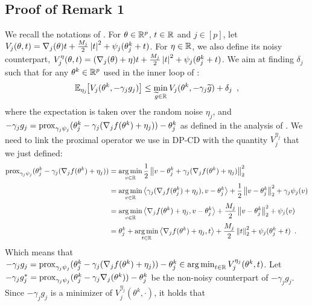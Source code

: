 
\subsection{Proof of Remark 1}
\label{sec:proof-remark-1}

We recall the notations of \citet{tappenden2016Inexact}.
For $\theta \in \mathbb R^p$, $t \in \mathbb R$ and $j \in [p]$, let
$V_j(\theta, t) = \nabla_j(\theta) t + \frac{M_j}{2} \left| t \right|^2 + \psi_j(\theta^k_j + t)$.
For $\eta \in \mathbb R$, we also define its noisy counterpart,
$V_j^{\eta}(\theta, t) = (\nabla_j(\theta) + \eta) t + \frac{M_j}{2} \left| t \right|^2 + \psi_j(\theta^k_j + t)$.
We aim at finding $\delta_j$ such that for any $\theta^k \in \mathbb R^p$ used in the
inner loop of :
\begin{align}
  \mathbb E_{\eta_j} \hspace{-0.29em} \left[ V_j(\theta^k, -\gamma_j g_j) \right]
  \le \min_{\widetilde g \in \mathbb R} V_j(\theta^k, -\gamma_j \widetilde g) + \delta_j\enspace,
\end{align}
where the expectation is taken over the random noise $\eta_j$, and
$- \gamma_j g_j = \operatorname{prox}_{\gamma_j \psi_j}(\theta^k_j - \gamma_j (\nabla_j f(\theta^k) + \eta_j)) - \theta^k_j$
as defined in the analysis of .
We need to link the proximal operator we use in DP-CD with the quantity
$V_j^{\eta_j}$ that we just defined:
\begin{align}
  \operatorname{prox}_{\gamma_j \psi_j} ( \theta^k_j - \gamma_j (\nabla_j f(\theta^k) + \eta_j) )
   & = \operatorname*{arg\,min}_{v \in \mathbb R}  \frac{1}{2} \left \lVert v - \theta^k_j + \gamma_j (\nabla_j f(\theta^k) + \eta_j) \right \rVert_2^2                                                 \\
   & = \operatorname*{arg\,min}_{v \in \mathbb R}  \left\langle \gamma_j (\nabla_j f(\theta^k_j) + \eta_j), v - \theta^k_j \right\rangle + \frac{1}{2} \left \lVert v - \theta^k_j \right \rVert_2^2 + \gamma_j \psi_j(v) \\
   & = \operatorname*{arg\,min}_{v \in \mathbb R}  \left\langle \nabla_j f(\theta^k) + \eta_j, v - \theta^k_j \right\rangle + \frac{M_j}{2} \left \lVert v - \theta^k_j \right \rVert_2^2 + \psi_j(v)                     \\
   & = \theta^k_j + \operatorname*{arg\,min}_{t \in \mathbb R}  \left\langle \nabla_j f(\theta^k) + \eta_j, t \right\rangle + \frac{M_j}{2} \left \lVert t \right \rVert_2^2 + \psi_j(\theta^k_j + t)\enspace.
\end{align}
Which means that
$-\gamma_j g_j
  =\operatorname{prox}_{\gamma_j \psi_j} ( \theta^k_j - \gamma_j (\nabla_j f(\theta^k) + \eta_j) ) -  \theta^k_j
  \in \operatorname*{arg\,min}_{t\in\mathbb R} V_j^{\eta_j}(\theta^k,t)$.
Let $-\gamma_j g_j^* = \operatorname{prox}_{\gamma_j \psi_j}(\theta^k_j - \gamma_j \nabla_j(\theta^k)) - \theta^k_j$
be the non-noisy counterpart of $-\gamma_j g_j$.
Since $-\gamma_j g_j$ is a minimizer of $V_j^{\eta_j}(\theta^k, \cdot)$, it holds that
